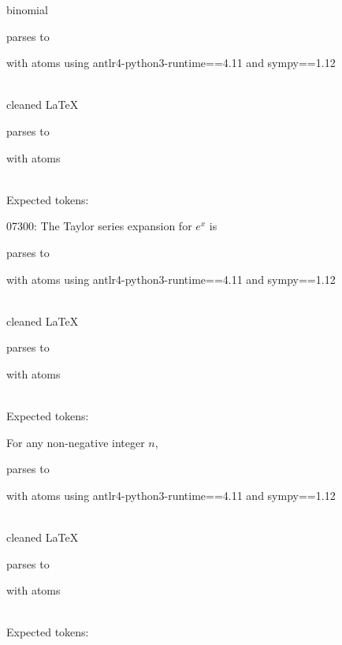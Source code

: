\documentclass{article}
\begin{document}
\hrulefill

binomial

parses to

with atoms
using antlr4-python3-runtime==4.11 and sympy==1.12

\ \\
cleaned \LaTeX

parses to

with atoms


\ \\
Expected tokens:


\hrulefill

07300:
The Taylor series expansion for $e^x$ is 

parses to

with atoms
using antlr4-python3-runtime==4.11 and sympy==1.12

\ \\
cleaned \LaTeX

parses to

with atoms


\ \\
Expected tokens:



\hrulefill


For any non-negative integer $n$,

parses to

with atoms
using antlr4-python3-runtime==4.11 and sympy==1.12

\ \\
cleaned \LaTeX

parses to

with atoms


\ \\
Expected tokens:

\end{document}
